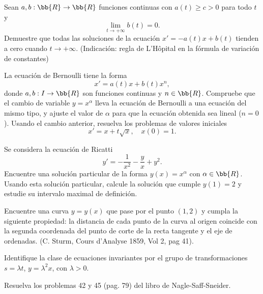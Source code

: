 \begin{ejercicio}
    Sean $a, b : \bb{R} \to \bb{R}$ funciones continuas con $a(t) \geq c > 0$ para todo $t$ y
    \begin{equation*}
        \lim_{t \to +\infty} b(t) = 0.
    \end{equation*}
    Demuestre que todas las soluciones de la ecuación $x' = -a(t)x + b(t)$ tienden a cero cuando $t \to +\infty$. (Indicación: regla de L'Hôpital en la fórmula de variación de constantes)
\end{ejercicio}

\begin{ejercicio}
    La ecuación de Bernoulli tiene la forma
    \begin{equation*}
        x' = a(t)x + b(t)x^n,
    \end{equation*}
    donde $a, b : I \to \bb{R}$ son funciones continuas y $n \in \bb{R}$. Compruebe que el cambio de variable $y = x^\alpha$ lleva la ecuación de Bernoulli a una ecuación del mismo tipo, y ajuste el valor de $\alpha$ para que la ecuación obtenida sea lineal ($n = 0$). Usando el cambio anterior, resuelva los problemas de valores iniciales
    \begin{equation*}
        x' = x + t\sqrt{x}, \quad x(0) = 1.
    \end{equation*}
\end{ejercicio}

\begin{ejercicio}
    Se considera la ecuación de Ricatti
    \begin{equation*}
        y' = -\dfrac{1}{x^2} - \dfrac{y}{x} + y^2.
    \end{equation*}
    Encuentre una solución particular de la forma $y(x) = x^\alpha$ con $\alpha \in \bb{R}$. Usando esta solución particular, calcule la solución que cumple $y(1) = 2$ y estudie su intervalo maximal de definición.
\end{ejercicio}

\begin{ejercicio}
    Encuentre una curva $y = y(x)$ que pase por el punto $(1, 2)$ y cumpla la siguiente propiedad: la distancia de cada punto de la curva al origen coincide con la segunda coordenada del punto de corte de la recta tangente y el eje de ordenadas. (C. Sturm, Cours d’Analyse 1859, Vol 2, pag 41).
\end{ejercicio}

\begin{ejercicio}
    Identifique la clase de ecuaciones invariantes por el grupo de transformaciones $s = \lambda t$, $y = \lambda^2 x$, con $\lambda > 0$.
\end{ejercicio}

\begin{ejercicio}
    Resuelva los problemas 42 y 45 (pag. 79) del libro de Nagle-Saff-Sneider.
\end{ejercicio}